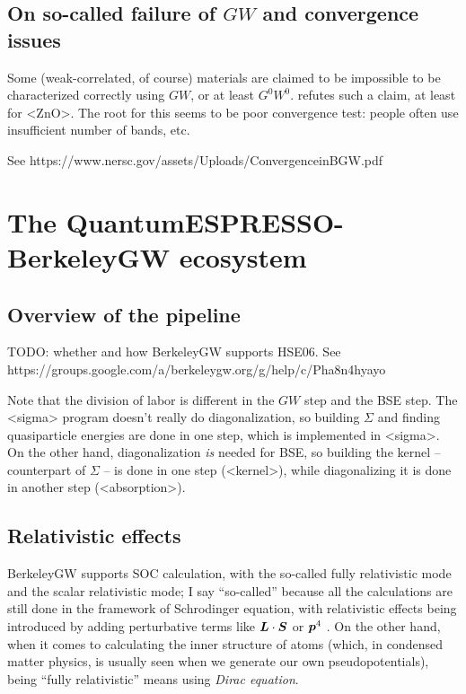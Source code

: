 \documentclass[hyperref, a4paper]{report}
\def\ce#1{<#1>}%
\def\texttt#1{<#1>}%
\newcommand{\shortcode}[1]{\texttt{#1}}
\begin{document}
\section{On so-called failure of $GW$ and convergence issues}

Some (weak-correlated, of course) materials are claimed to be impossible 
to be characterized correctly using $GW$,
or at least $G^0 W^0$.
\cite{shih2010quasiparticle} refutes such a claim, 
at least for \ce{ZnO}.
The root for this seems to be poor convergence test:
people often use insufficient number of bands, etc.

See https://www.nersc.gov/assets/Uploads/ConvergenceinBGW.pdf

\chapter{The QuantumESPRESSO-BerkeleyGW ecosystem}

\section{Overview of the pipeline}

TODO: whether and how BerkeleyGW supports HSE06.
See https://groups.google.com/a/berkeleygw.org/g/help/c/Pha8n4hyayo

Note that the division of labor is different in the $GW$ step and the BSE step.
The \shortcode{sigma} program doesn't really do diagonalization,
so building $\Sigma$ and finding quasiparticle energies 
are done in one step, which is implemented in \shortcode{sigma}.
On the other hand, 
diagonalization \emph{is} needed for BSE,
so building the kernel -- counterpart of $\Sigma$ -- 
is done in one step (\shortcode{kernel}),
while diagonalizing it is done in another step (\shortcode{absorption}).

\section{Relativistic effects}

BerkeleyGW supports SOC calculation, 
with the so-called fully relativistic mode 
and the scalar relativistic mode;
I say ``so-called'' because all the calculations are still done 
in the framework of Schrodinger equation,
with relativistic effects being introduced by 
adding perturbative terms like $\vb*{L} \cdot \vb*{S}$ or $\vb*{p}^4$ \cite{barker2022spinor}.
On the other hand, when it comes to calculating the inner structure of atoms 
(which, in condensed matter physics,
is usually seen when we generate our own pseudopotentials),
being ``fully relativistic'' means using \emph{Dirac equation}.
\end{document}
